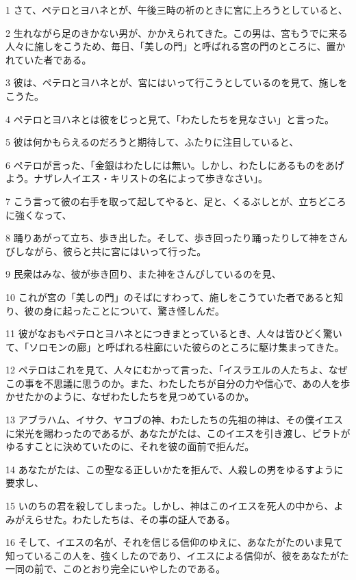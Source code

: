\par 1 さて、ペテロとヨハネとが、午後三時の祈のときに宮に上ろうとしていると、
\par 2 生れながら足のきかない男が、かかえられてきた。この男は、宮もうでに来る人々に施しをこうため、毎日、「美しの門」と呼ばれる宮の門のところに、置かれていた者である。
\par 3 彼は、ペテロとヨハネとが、宮にはいって行こうとしているのを見て、施しをこうた。
\par 4 ペテロとヨハネとは彼をじっと見て、「わたしたちを見なさい」と言った。
\par 5 彼は何かもらえるのだろうと期待して、ふたりに注目していると、
\par 6 ペテロが言った、「金銀はわたしには無い。しかし、わたしにあるものをあげよう。ナザレ人イエス・キリストの名によって歩きなさい」。
\par 7 こう言って彼の右手を取って起してやると、足と、くるぶしとが、立ちどころに強くなって、
\par 8 踊りあがって立ち、歩き出した。そして、歩き回ったり踊ったりして神をさんびしながら、彼らと共に宮にはいって行った。
\par 9 民衆はみな、彼が歩き回り、また神をさんびしているのを見、
\par 10 これが宮の「美しの門」のそばにすわって、施しをこうていた者であると知り、彼の身に起ったことについて、驚き怪しんだ。
\par 11 彼がなおもペテロとヨハネとにつきまとっているとき、人々は皆ひどく驚いて、「ソロモンの廊」と呼ばれる柱廊にいた彼らのところに駆け集まってきた。
\par 12 ペテロはこれを見て、人々にむかって言った、「イスラエルの人たちよ、なぜこの事を不思議に思うのか。また、わたしたちが自分の力や信心で、あの人を歩かせたかのように、なぜわたしたちを見つめているのか。
\par 13 アブラハム、イサク、ヤコブの神、わたしたちの先祖の神は、その僕イエスに栄光を賜わったのであるが、あなたがたは、このイエスを引き渡し、ピラトがゆるすことに決めていたのに、それを彼の面前で拒んだ。
\par 14 あなたがたは、この聖なる正しいかたを拒んで、人殺しの男をゆるすように要求し、
\par 15 いのちの君を殺してしまった。しかし、神はこのイエスを死人の中から、よみがえらせた。わたしたちは、その事の証人である。
\par 16 そして、イエスの名が、それを信じる信仰のゆえに、あなたがたのいま見て知っているこの人を、強くしたのであり、イエスによる信仰が、彼をあなたがた一同の前で、このとおり完全にいやしたのである。
